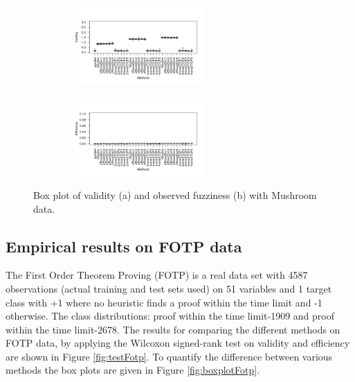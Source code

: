 \documentclass[main]{subfiles}
\begin{document}
\begin{figure}[h]
\centering
\begin{subfigure}{.5\textwidth}
  \centering
  \includegraphics[width=6cm,height=3cm]{images/boxplotMush}
\end{subfigure}%
\begin{subfigure}{.5\textwidth}
  \centering
  \includegraphics[width=6cm,height=3cm]{images/boxplotMush_eff}
\end{subfigure}%
\caption{Box plot of validity (a) and observed fuzziness (b) with Mushroom data.} \label{fig:boxplotMush}
\end{figure}

\subsection{Empirical results on FOTP data}
The First Order Theorem Proving (FOTP) is a real data set with 4587 observations (actual training and test sets used) on 51 variables and 1 target class with +1 where no heuristic finds a   proof within the time limit and -1 otherwise.  The class distributions: proof within the time limit-1909 and proof within the time limit-2678. The results for comparing the different methods on FOTP data, by applying the Wilcoxon signed-rank test on validity and efficiency are shown in Figure \ref{fig:testFotp}. To quantify the difference between various methods the box plots are given in Figure \ref{fig:boxplotFotp}.
\end{document}
